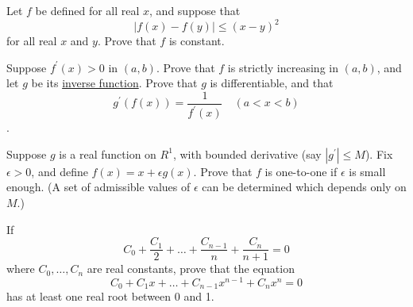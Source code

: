   \begin{exercise}[Rudin 5.1]
    Let $f$ be defined for all real $x$, and suppose that
    \begin{equation}
      |f(x) - f(y)| \le (x - y)^2
    \end{equation}
    for all real $x$ and $y$. Prove that $f$ is constant.
  \end{exercise}
  \begin{solution}

  \end{solution}

  \begin{exercise}[Rudin 5.2]
    Suppose $f^\prime(x) > 0$ in $(a, b)$. Prove that $f$ is strictly increasing in $(a, b)$, and let $g$ be its \hyperref[thm:inverse-ft]{inverse function}. Prove that $g$ is differentiable, and that
    \begin{equation}
      g^\prime(f(x)) = \frac{1}{f^\prime(x)} \quad (a < x < b)
    \end{equation}
   .
  \end{exercise}
  \begin{solution}

  \end{solution}

  \begin{exercise}[Rudin 5.3]
    Suppose $g$ is a real function on $R^1$, with bounded derivative (say $|g^\prime| \le M$). Fix $\epsilon > 0$, and define $f(x) = x + \epsilon g(x)$. Prove that $f$ is one-to-one if $\epsilon$ is small enough. (A set of admissible values of $\epsilon$ can be determined which depends only on $M$.)
  \end{exercise}
  \begin{solution}

  \end{solution}

  \begin{exercise}[Rudin 5.4]
    If
    \begin{equation}
      C_0 + \frac{C_1}{2} + \dots + \frac{C_{n-1}}{n} + \frac{C_n}{n+1} = 0
    \end{equation}
    where $C_0, \dots, C_n$ are real constants, prove that the equation
    \begin{equation}
      C_0 + C_1 x + \dots + C_{n-1} x^{n-1} + C_n x^n = 0
    \end{equation}
    has at least one real root between 0 and 1.
  \end{exercise}
  \begin{solution}

  \end{solution}

